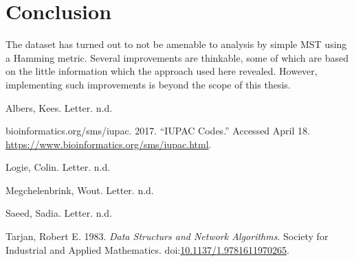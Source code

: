 \documentclass[fleqn]{book}
\begin{document}
\chapter{Conclusion}\label{conclusion}

The dataset has turned out to not be amenable to analysis by simple MST
using a Hamming metric. Several improvements are thinkable, some of
which are based on the little information which the approach used here
revealed. However, implementing such improvements is beyond the scope of
this thesis.

\hypertarget{refs}{}
\hypertarget{ref-kees}{}
Albers, Kees. Letter. n.d.

\hypertarget{ref-iupacodes}{}
bioinformatics.org/sms/iupac. 2017. ``IUPAC Codes.'' Accessed April 18.
\url{https://www.bioinformatics.org/sms/iupac.html}.

\hypertarget{ref-colin}{}
Logie, Colin. Letter. n.d.

\hypertarget{ref-wout}{}
Megchelenbrink, Wout. Letter. n.d.

\hypertarget{ref-sadia}{}
Saeed, Sadia. Letter. n.d.

\hypertarget{ref-tarjan1983}{}
Tarjan, Robert E. 1983. \emph{Data Structurs and Network Algorithms}.
Society for Industrial and Applied Mathematics.
doi:\href{https://doi.org/10.1137/1.9781611970265}{10.1137/1.9781611970265}.
\end{document}

